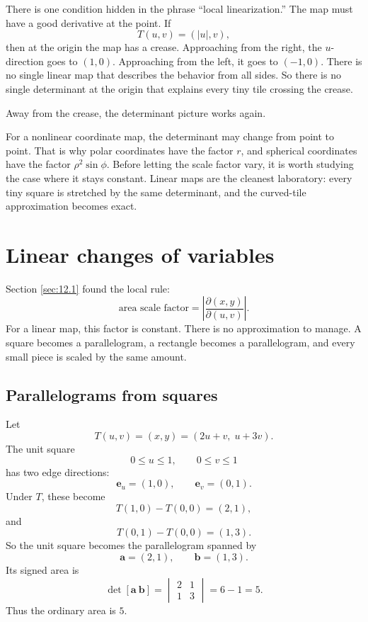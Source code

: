 There is one condition hidden in the phrase ``local linearization.''  The map must have
a good derivative at the point.  If
\[
    T(u,v)=(|u|,v),
\]
then at the origin the map has a crease.  Approaching from the right, the \(u\)-direction
goes to \((1,0)\).  Approaching from the left, it goes to \((-1,0)\).  There is no single
linear map that describes the behavior from all sides.  So there is no single determinant
at the origin that explains every tiny tile crossing the crease.

Away from the crease, the determinant picture works again.

For a nonlinear coordinate map, the determinant may change from point to point.  That
is why polar coordinates have the factor \(r\), and spherical coordinates have the factor
\(\rho^2\sin\phi\).  Before letting the scale factor vary, it is worth studying the case
where it stays constant.  Linear maps are the cleanest laboratory: every tiny square is
stretched by the same determinant, and the curved-tile approximation becomes exact.

\section{Linear changes of variables}
\label{sec:12.2}

Section \ref{sec:12.1} found the local rule:
\[
    \text{area scale factor}=\left|\frac{\partial(x,y)}{\partial(u,v)}\right|.
\]
For a linear map, this factor is constant.  There is no approximation to manage.  A
square becomes a parallelogram, a rectangle becomes a parallelogram, and every small
piece is scaled by the same amount.

\subsection{Parallelograms from squares}

Let
\[
    T(u,v)=(x,y)=(2u+v,\;u+3v).
\]
The unit square
\[
    0\le u\le1,\qquad 0\le v\le1
\]
has two edge directions:
\[
    \mathbf e_u=(1,0),
    \qquad
    \mathbf e_v=(0,1).
\]
Under \(T\), these become
\[
    T(1,0)-T(0,0)=(2,1),
\]
and
\[
    T(0,1)-T(0,0)=(1,3).
\]
So the unit square becomes the parallelogram spanned by
\[
    \mathbf a=(2,1),
    \qquad
    \mathbf b=(1,3).
\]
Its signed area is
\[
    \det[\mathbf a\ \mathbf b]
    =
    \begin{vmatrix}
        2&1\\
        1&3
    \end{vmatrix}
    =
    6-1
    =
    5.
\]
Thus the ordinary area is \(5\).

